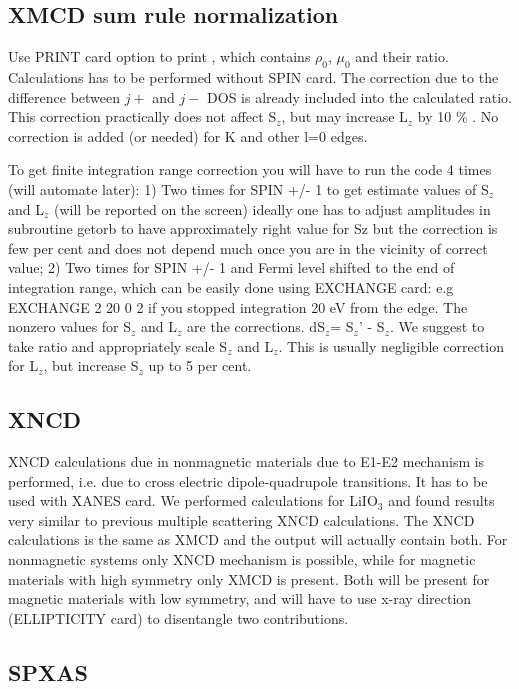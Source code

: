 \documentclass[11pt,oneside]{report} %
\begin{document}
\subsection{XMCD sum rule normalization}
\label{sec:XMCDNORM}

Use PRINT card option to print , which contains 
$\rho_0$, $\mu_0$ and their ratio.  Calculations has to be performed
without SPIN card. The correction due to the difference between $j+$ and $j- $
DOS is already included into the calculated ratio.
This correction practically does not affect S$_z$, but may increase
L$_z$ by 10 \% .
No correction is added (or needed) for K and other l=0 edges.

To get finite integration range correction you will have to run
the code 4 times (will automate later): 1) Two times for SPIN +/- 1 to get
estimate values of S$_z$ and L$_z$ (will be reported on the screen) 
ideally one has to adjust amplitudes in subroutine getorb to have
approximately right value for Sz but the correction is few per cent
and does not depend much once you are in the vicinity of correct value;
2) Two times for SPIN +/- 1 and Fermi level shifted 
to the end of integration range, which can be easily done
using EXCHANGE card: e.g EXCHANGE 2  20 0  2 
if you stopped integration 20 eV from the edge. The nonzero
values for S$_z$ and L$_z$ are the corrections. dS$_z$= S$_z$' - S$_z$.
We suggest to take ratio and appropriately scale S$_z$ and L$_z$.
This is usually negligible correction for L$_z$, but increase S$_z$ 
up to 5 per cent.

\subsection{XNCD}
\label{sec:XNCD}

XNCD calculations due in nonmagnetic materials due
to E1-E2 mechanism is performed, i.e. due to
cross electric dipole-quadrupole transitions. It has to be used with
XANES card. We performed calculations for LiIO$_3$ and found results
very similar to previous multiple scattering XNCD calculations.
The XNCD calculations is the same as XMCD and the output will actually
contain both. For nonmagnetic systems only XNCD mechanism is possible,
while for magnetic materials with high symmetry only XMCD is present.
Both will be present for magnetic materials with low symmetry, and
will have to use x-ray direction (ELLIPTICITY card) to disentangle 
two contributions.

\subsection{SPXAS}
\label{sec:SPXAS}
\end{document}
